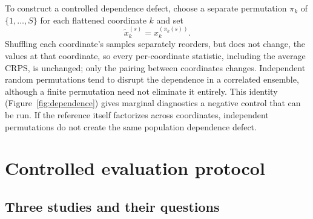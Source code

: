 \documentclass[11pt,a4paper]{article}
\begin{document}
To construct a controlled dependence defect, choose a separate permutation
$\pi_k$ of $\{1,\ldots,S\}$ for each flattened coordinate $k$ and set
\begin{equation}
 \widetilde{x}^{(s)}_k=x^{(\pi_k(s))}_k.
 \label{eq:permutation}
\end{equation}
Shuffling each coordinate's samples separately reorders, but does not
change, the values at that coordinate, so every per-coordinate statistic,
including the average CRPS, is unchanged; only the pairing between
coordinates changes. Independent random
permutations tend to disrupt the dependence in a correlated ensemble,
although a finite permutation need not eliminate it entirely. This
identity (Figure~\ref{fig:dependence}) gives marginal diagnostics a negative control that can be run.
If the reference itself factorizes across coordinates, independent
permutations do not create the same population dependence defect.

\section{Controlled evaluation protocol}
\label{sec:protocol}

\subsection{Three studies and their questions}
\end{document}
